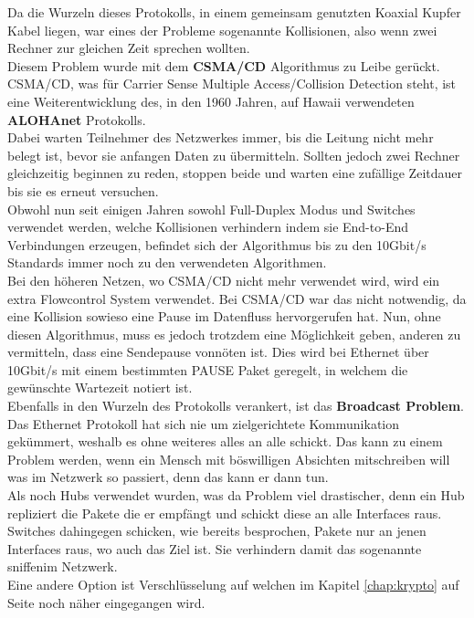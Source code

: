 \documentclass[12pt,a4paper]{report}
\begin{document}
Da die Wurzeln dieses Protokolls, in einem gemeinsam genutzten Koaxial Kupfer Kabel liegen, war eines der Probleme sogenannte Kollisionen, also wenn zwei Rechner zur gleichen Zeit sprechen wollten.\\
Diesem Problem wurde mit dem \textbf{CSMA/CD} Algorithmus zu Leibe gerückt. CSMA/CD, was für Carrier Sense Multiple Access/Collision Detection steht, ist eine Weiterentwicklung des, in den 1960 Jahren, auf Hawaii verwendeten \textbf{ALOHAnet} Protokolls.\\
Dabei warten Teilnehmer des Netzwerkes immer, bis die Leitung nicht mehr belegt ist, bevor sie anfangen Daten zu übermitteln. Sollten jedoch zwei Rechner gleichzeitig beginnen zu reden, stoppen beide und warten eine zufällige Zeitdauer bis sie es erneut versuchen.\\
Obwohl nun seit einigen Jahren sowohl Full-Duplex Modus und Switches verwendet werden, welche Kollisionen verhindern indem sie End-to-End Verbindungen erzeugen, befindet sich der Algorithmus bis zu den 10Gbit/s Standards immer noch zu den verwendeten Algorithmen.\\
Bei den höheren Netzen, wo CSMA/CD nicht mehr verwendet wird, wird ein extra Flowcontrol System verwendet. Bei CSMA/CD war das nicht notwendig, da eine Kollision sowieso eine Pause im Datenfluss hervorgerufen hat. Nun, ohne diesen Algorithmus, muss es jedoch trotzdem eine Möglichkeit geben, anderen zu vermitteln, dass eine Sendepause vonnöten ist. Dies wird bei Ethernet über 10Gbit/s mit einem bestimmten PAUSE Paket geregelt, in welchem die gewünschte Wartezeit notiert ist.\\

Ebenfalls in den Wurzeln des Protokolls verankert, ist das \textbf{Broadcast Problem}.\\
Das Ethernet Protokoll hat sich nie um zielgerichtete Kommunikation gekümmert, weshalb es ohne weiteres alles an alle schickt. Das kann zu einem Problem werden, wenn ein Mensch mit böswilligen Absichten mitschreiben will was im Netzwerk so passiert, denn das kann er dann tun.\\
Als noch Hubs verwendet wurden, was da Problem viel drastischer, denn ein Hub repliziert die Pakete die er empfängt und schickt diese an alle Interfaces raus.\\
Switches dahingegen schicken, wie bereits besprochen, Pakete nur an jenen Interfaces raus, wo auch das Ziel ist. Sie verhindern damit das sogenannte \glqq sniffen\grqq im Netzwerk.\\
Eine andere Option ist Verschlüsselung auf welchen im Kapitel \ref{chap:krypto} auf Seite \pageref{chap:krypto} noch näher eingegangen wird.\\
\end{document}
